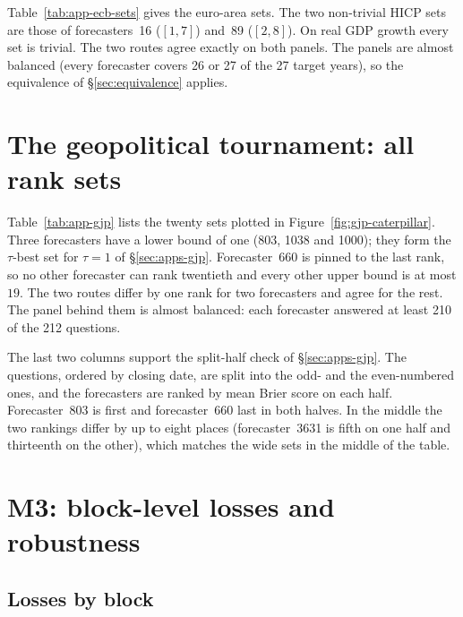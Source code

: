 \begin{appendix}
Table~\ref{tab:app-ecb-sets} gives the euro-area sets. The two non-trivial HICP sets are
those of forecasters~16 ($[1,7]$) and~89 ($[2,8]$). On real GDP growth every set is
trivial. The two routes agree exactly on both panels. The panels are almost balanced
(every forecaster covers 26 or 27 of the 27 target years), so the equivalence of
\S\ref{sec:equivalence} applies.

\tabAppSpfSets
\tabAppEcbSets

\section{The geopolitical tournament: all rank sets}
\label{app:add-gjp}

Table~\ref{tab:app-gjp} lists the twenty sets plotted in
Figure~\ref{fig:gjp-caterpillar}. Three forecasters have a lower bound of one
(803, 1038 and 1000); they form the $\tau$-best set for $\tau=1$ of
\S\ref{sec:apps-gjp}. Forecaster~660 is pinned to the last rank, so no other forecaster
can rank twentieth and every other upper bound is at most $19$. The two routes differ
by one rank for two forecasters and agree for the rest. The panel behind them is almost
balanced: each forecaster answered at least 210 of the 212 questions.

The last two columns support the split-half check of \S\ref{sec:apps-gjp}. The questions,
ordered by closing date, are split into the odd- and the even-numbered ones, and the
forecasters are ranked by mean Brier score on each half. Forecaster~803 is first and
forecaster~660 last in both halves. In the middle the two rankings differ by up to eight
places (forecaster~3631 is fifth on one half and thirteenth on the other), which matches
the wide sets in the middle of the table.

\tabAppGjp

\section{M3: block-level losses and robustness}
\label{app:add-m3}

\subsection{Losses by block}
\label{app:add-m3-blocks}


\end{appendix}
